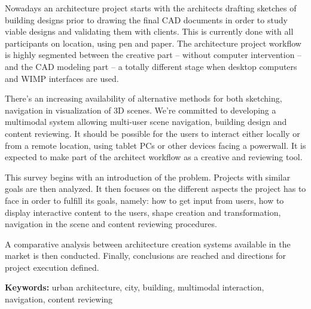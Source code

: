 Nowadays an architecture project starts with the architects drafting sketches of building designs
prior to drawing the final CAD documents in order to study viable designs and validating them with clients.
This is currently done with all participants on location, using pen and paper.
The architecture project workflow is highly segmented between the creative part -- without computer intervention --
and the CAD modeling part -- a totally different stage when desktop computers and WIMP interfaces are used.

There's an increasing availability of alternative methods for both sketching, navigation in visualization
of 3D scenes.
We're committed to developing a multimodal system allowing multi-user scene navigation, building design
and content reviewing.
It should be possible for the users to interact either locally or from a remote location, using tablet PCs
or other devices facing a powerwall.
It is expected to make part of the architect workflow as a creative and reviewing tool.

This survey begins with an introduction of the problem.
Projects with similar goals are then analyzed.
It then focuses on the different aspects the project has to face in order to fulfill its goals, namely:
how to get input from users,
how to display interactive content to the users,
shape creation and transformation,
navigation in the scene and
content reviewing procedures.

A comparative analysis between architecture creation systems available in the market is then conducted.
Finally, conclusions are reached and directions for project execution defined.




\textbf{Keywords:} urban architecture, city, building, multimodal interaction, navigation, content reviewing


